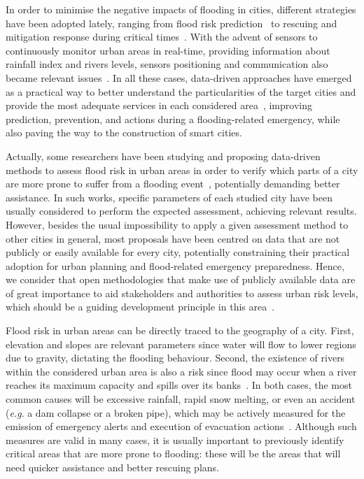 \begin{refsection}
In order to minimise the negative impacts of flooding in cities, different strategies have been adopted lately, ranging from flood risk prediction~\cite{prediction} to rescuing and mitigation response during critical times~\cite{rescuing}. With the advent of sensors to continuously monitor urban areas in real-time, providing information about rainfall index and rivers levels, sensors positioning and communication also became relevant issues~\cite{sensorsposition}. In all these cases, data-driven approaches have emerged as a practical way to better understand the particularities of the target cities and provide the most adequate services in each considered area~\cite{redi}, improving prediction, prevention, and actions during a flooding-related emergency, while also paving the way to the construction of smart cities.

Actually, some researchers have been studying and proposing data-driven methods to assess flood risk in urban areas in order to verify which parts of a city are more prone to suffer from a flooding event~\cite{elevation1,elevation2,elevation3,georeferenced}, potentially demanding better assistance. In such works, specific parameters of each studied city have been usually considered to perform the expected assessment, achieving relevant results. However, besides the usual impossibility to apply a given assessment method to other cities in general, most proposals have been centred on data that are not publicly or easily available for every city, potentially constraining their practical adoption for urban planning and flood-related emergency preparedness. Hence, we consider that open methodologies that make use of publicly available data are of great importance to aid stakeholders and authorities to assess urban risk levels, which should be a guiding development principle in this area~\cite{opendata1,opendata2}.

Flood risk in urban areas can be directly traced to the geography of a city. First, elevation and slopes are relevant parameters since water will flow to lower regions due to gravity, dictating the flooding behaviour. Second, the existence of rivers within the considered urban area is also a risk since flood may occur when a river reaches its maximum capacity and spills over its banks~\cite{cityflood}. In both cases, the most common causes will be excessive rainfall, rapid snow melting, or even an accident (\textit{e.g}. a dam collapse or a broken pipe), which may be actively measured for the emission of emergency alerts and execution of evacuation actions~\cite{damiot}. Although such measures are valid in many cases, it is usually important to previously identify critical areas that are more prone to flooding: these will be the areas that will need quicker assistance and better rescuing plans. 


\end{refsection}
